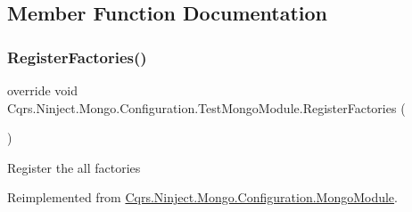 \subsection{Member Function Documentation}
\mbox{\label{classCqrs_1_1Ninject_1_1Mongo_1_1Configuration_1_1TestMongoModule_a8cce844ec177b88a0be2ca8f71b2bc6b_a8cce844ec177b88a0be2ca8f71b2bc6b}} 
\subsubsection{\texorpdfstring{Register\+Factories()}{RegisterFactories()}}
{\footnotesize\ttfamily override void Cqrs.\+Ninject.\+Mongo.\+Configuration.\+Test\+Mongo\+Module.\+Register\+Factories (\begin{DoxyParamCaption}{ }\end{DoxyParamCaption})\hspace{0.3cm}{\ttfamily [virtual]}}



Register the all factories 



Reimplemented from \hyperlink{classCqrs_1_1Ninject_1_1Mongo_1_1Configuration_1_1MongoModule_a052d4cd960c3c5da037a04e43424c9c8_a052d4cd960c3c5da037a04e43424c9c8}{Cqrs.\+Ninject.\+Mongo.\+Configuration.\+Mongo\+Module}.

